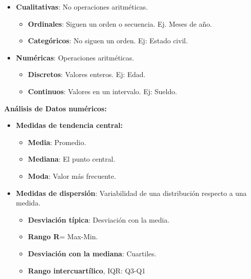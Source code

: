 \documentclass[12pt, twoside, openright]{report} %
\begin{document}
\begin{itemize}

\item
  \textbf{Cualitativas}: No operaciones aritméticas.

  \begin{itemize}
  
  \item
    \textbf{Ordinales}: Siguen un orden o secuencia. Ej. Meses de año.
  \item
    \textbf{Categóricos}: No siguen un orden. Ej: Estado civil.
  \end{itemize}
\item
  \textbf{Numéricas}: Operaciones aritméticas.

  \begin{itemize}
  
  \item
    \textbf{Discretos}: Valores enteros. Ej: Edad.
  \item
    \textbf{Continuos}: Valores en un intervalo. Ej: Sueldo.
  \end{itemize}
\end{itemize}

\textbf{Análisis de Datos numéricos:}

\begin{itemize}

\item
  \textbf{Medidas de tendencia central:}

  \begin{itemize}
  
  \item
    \textbf{Media}: Promedio.

    
    \item
      \textbf{Mediana}: El punto central.
    \item
      \textbf{Moda}: Valor más frecuente.
  \end{itemize}
\item
  \textbf{Medidas de dispersión}: Variabilidad de una distribución
  respecto a una medida.

  \begin{itemize}
  
  \item
    \textbf{Desviación típica}: Desviación con la media.
    
    \item
      \textbf{Rango R}= Max-Min.
    \item
      \textbf{Desviación con la mediana}: Cuartiles.
    \item
      \textbf{Rango intercuartílico}, IQR: Q3-Q1
  \end{itemize}
\end{itemize}
\end{document}
